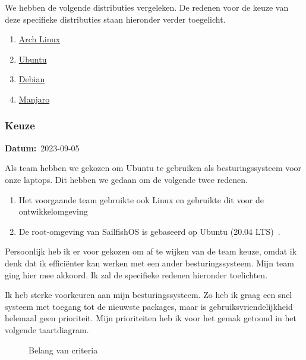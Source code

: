 \documentclass[a4paper]{report}
\newcommand{\timestamp}[1]{
  \mbox{\scriptsize \textbf{Datum:} #1} \smallbreak
}
\begin{document}
We hebben de volgende distributies vergeleken. De redenen voor de keuze van deze specifieke distributies staan hieronder verder toegelicht.
\begin{enumerate}
  \item \href{https://archlinux.org/}{Arch Linux}
  \item \href{https://ubuntu.com/}{Ubuntu}
  \item \href{https://www.debian.org/}{Debian}
  \item \href{https://manjaro.org/}{Manjaro}
\end{enumerate}


\subsubsection{Keuze}
\timestamp{2023-09-05}
Als team hebben we gekozen om Ubuntu te gebruiken als besturingssysteem voor onze laptops. 
Dit hebben we gedaan om de volgende twee redenen.
\begin{enumerate}
  \item Het voorgaande team gebruikte ook Linux en gebruikte dit voor de ontwikkelomgeving~\cite{fairphonegithub}
  \item De root-omgeving van SailfishOS is gebaseerd op Ubuntu (20.04 LTS)~\cite{sailfishportingguide}.
\end{enumerate}

Persoonlijk heb ik er voor gekozen om af te wijken van de team keuze, omdat ik denk dat ik efficiënter kan werken met een ander besturingssysteem.
Mijn team ging hier mee akkoord. Ik zal de specifieke redenen hieronder toelichten.
\par\smallskip
Ik heb sterke voorkeuren aan mijn besturingssysteem. Zo heb ik graag een snel systeem met toegang tot de nieuwste packages, maar is gebruiksvriendelijkheid helemaal geen prioriteit.
Mijn prioriteiten heb ik voor het gemak getoond in het volgende taartdiagram. 
\begin{figure}
  \centering
{}
\caption{Belang van criteria}
\label{graph:spec_percentages}
\end{figure}
\end{document}
